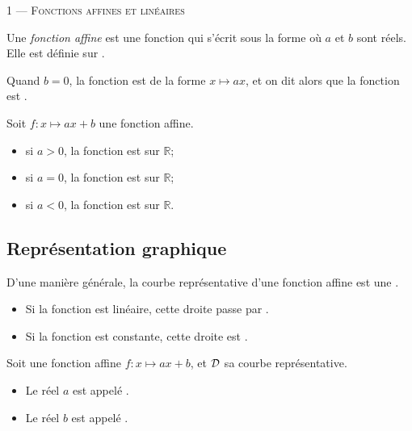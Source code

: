 \documentclass[11pt]{article}
\begin{document}
\begin{center}\large
  \textsc{1 --- Fonctions affines et linéaires}
\end{center}

\begin{definition}
  Une \emph{fonction affine} est une fonction qui s'écrit sous la forme  où $a$ et $b$ sont réels. Elle est définie sur .

  Quand $b=0$, la fonction est de la forme $x\mapsto ax$, et on dit alors que
  la fonction est .
\end{definition}

\begin{propriete}
  Soit $f:x\mapsto ax+b$ une fonction affine.
  \begin{itemize}
    \item si $a>0$, la fonction est  sur $\mathbb R$;
    \item si $a=0$, la fonction est  sur $\mathbb R$;
    \item si $a<0$, la fonction est  sur $\mathbb R$.
  \end{itemize}
\end{propriete}

\subsection*{Représentation graphique}

\begin{propriete}D'une manière générale, la courbe représentative d'une
  fonction affine est une .

  \begin{itemize}
    \item Si la fonction est linéaire, cette droite passe par .
    \item Si la fonction est constante, cette droite est .
    \end{itemize}
\end{propriete}

\begin{definition}Soit une fonction affine $f:x\mapsto ax+b$, et $\cal D$ sa courbe représentative.
  \begin{itemize}
    \item Le réel $a$ est appelé .
    \item Le réel $b$ est appelé .
  \end{itemize}
\end{definition}
\end{document}
